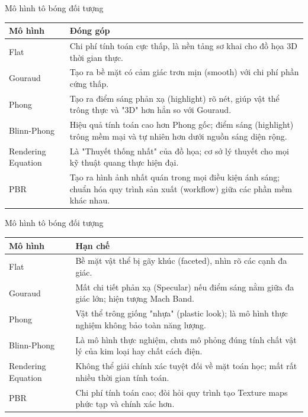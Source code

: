 \documentclass[11pt, aspectratio=169]{beamer}
\begin{document}
\begin{frame}{Mô hình tô bóng đối tượng}
	\begin{table}[h]
		\centering
		\begin{tabular}{|p{2cm}|p{11cm}|}
			\hline
			\textbf{Mô hình} & \textbf{Đóng góp} \\ \hline
			Flat & Chi phí tính toán cực thấp, là nền tảng sơ khai cho đồ họa 3D thời gian thực. \\ \hline
			Gouraud & Tạo ra bề mặt có cảm giác trơn mịn (smooth) với chi phí phần cứng thấp. \\ \hline
			Phong & Tạo ra điểm sáng phản xạ (highlight) rõ nét, giúp vật thể trông thực và "3D" hơn hẳn so với Gouraud. \\ \hline
			Blinn-Phong & Hiệu quả tính toán cao hơn Phong gốc; điểm sáng (highlight) trông mềm mại và tự nhiên hơn dưới nguồn sáng diện rộng. \\ \hline
			Rendering Equation & Là "Thuyết thống nhất" của đồ họa; cơ sở lý thuyết cho mọi kỹ thuật quang thực hiện đại. \\ \hline
			PBR & Tạo ra hình ảnh nhất quán trong mọi điều kiện ánh sáng; chuẩn hóa quy trình sản xuất (workflow) giữa các phần mềm khác nhau. \\ \hline
		\end{tabular}
	\end{table}
\end{frame}

\begin{frame}{Mô hình tô bóng đối tượng}
	\begin{table}[h]
		\centering
		\begin{tabular}{|l|p{10cm}|}
			\hline
			\textbf{Mô hình} & \textbf{Hạn chế} \\ \hline
			Flat & Bề mặt vật thể bị gãy khúc (faceted), nhìn rõ các cạnh đa giác. \\ \hline
			Gouraud & Mất chi tiết phản xạ (Specular) nếu điểm sáng nằm giữa đa giác lớn; hiện tượng Mach Band. \\ \hline
			Phong & Vật thể trông giống "nhựa" (plastic look); là mô hình thực nghiệm không bảo toàn năng lượng. \\ \hline
			Blinn-Phong & Là mô hình thực nghiệm, chưa mô phỏng đúng tính chất vật lý của kim loại hay chất cách điện. \\ \hline
			Rendering Equation & Không thể giải chính xác tuyệt đối về mặt toán học; mất rất nhiều thời gian tính toán. \\ \hline
			PBR & Chi phí tính toán cao; đòi hỏi quy trình tạo Texture maps phức tạp và chính xác hơn. \\ \hline
		\end{tabular}
	\end{table}
\end{frame}
\end{document}
